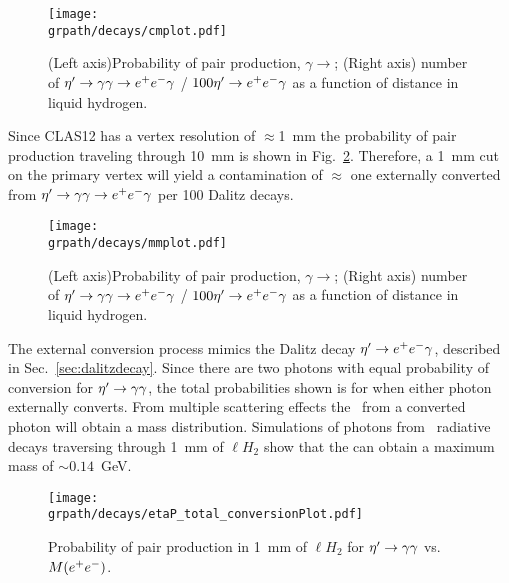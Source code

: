 \begin{figure}[h!]\begin{center}
	\texttt{[image: \\grpath/decays/cmplot.pdf]}
	\caption[Probability of pair production, $\gamma \to$\epemT, as a function of distance in liquid hydrogen]{\label{fig:conversion}{(Left axis)Probability of pair production, $\gamma \to$\epemT; (Right axis) number of $\eta^{\prime} \to \gamma \gamma \rightarrow e^+e^- \gamma$ / $100 \eta^{\prime} \rightarrow e^+e^- \gamma$ as a function of distance in liquid hydrogen.}}
\end{center}\end{figure}
	Since CLAS12 has a vertex resolution of $\approx$1~mm the probability of pair production traveling through 10~mm is shown in Fig.~\ref{fig:conversionmm}. Therefore, a 1~mm cut on the primary vertex will yield a contamination of $\approx$ one externally converted \epemT from $\eta^{\prime} \to \gamma \gamma \rightarrow e^+e^- \gamma$ per 100 Dalitz decays.
\begin{figure}[h!]\begin{center}
	\texttt{[image: \\grpath/decays/mmplot.pdf]}
	\caption[Probability of pair production, $\gamma \to$\epemT, as a function of distance in liquid hydrogen]{\label{fig:conversionmm}{(Left axis)Probability of pair production, $\gamma \to$\epemT; (Right axis) number of $\eta^{\prime} \to \gamma \gamma \rightarrow e^+e^- \gamma$ / $100 \eta^{\prime} \rightarrow e^+e^- \gamma$ as a function of distance in liquid hydrogen.}}
\end{center}\end{figure}
The external conversion process mimics the Dalitz decay  $\eta^{\prime} \to e^+e^- \gamma$, described in Sec.~\ref{sec:dalitzdecay}. Since there are two photons with equal probability of conversion for $\eta^{\prime} \to \gamma \gamma$, the total probabilities shown is for when either photon externally converts.
From multiple scattering effects the \epemT \ from a converted photon will obtain a mass distribution. Simulations of photons from \etaTP \ radiative decays traversing through 1~mm of $\ell H_2$  show that the \epemT can obtain a maximum mass of $\sim 0.14$~GeV.		
\begin{figure}[h!]\begin{center}
		\texttt{[image: \\grpath/decays/etaP\_total\_conversionPlot.pdf]}
		\caption[Probability of pair production, $\gamma \to$\epemT, as a function of $M(\epem)$]{\label{fig:conversion_inM}{Probability of pair production in 1~mm of  $\ell H_2$ for $\eta^{\prime} \to \gamma \gamma $ vs. $M(\epem)$.}}
\end{center}\end{figure}
